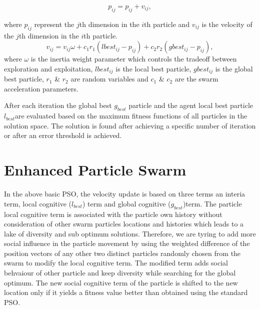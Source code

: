 \documentclass[10pt]{article}
\begin{document}
\begin{equation}
p_{ij}=p_{ij}+v_{ij},
\label{eq:Swarm1}
\end{equation}
 
where $p_{ij}$ represent the $j$th dimension in the $i$th particle and $v_{ij}$ is the velocity of the $j$th dimension in the $i$th particle.
 \begin{equation}
v_{ij}  = v_{ij} \omega + c_1 r_1 (lbest_{ij}  - p_{ij} ) + c_2 r_2 (gbest_{ij}  - p_{ij} ),
\label{eq:Swarm}
\end{equation}
 where $\omega$ is the inertia weight parameter which controls the tradeoff between exploration and exploitation,  $lbest_{ij}$ is the local best particle, $gbest_{ij}$ is the global best particle, $r_1$ \& $r_2$ are random variables and $c_1$ \& $c_2$ are the swarm acceleration parameters.  
 
 After each iteration the global best $g_{best}$ particle and the agent local best particle $l_{best}$are evaluated based on the maximum fitness functions of all particles in the solution space. The solution is found after achieving a specific number of iteration or after an error threshold is achieved.

\section{Enhanced Particle Swarm}
\label{sec:EnhancedSwarmAlgorithm}
In the above basic PSO, the velocity update is based on three terms an interia term, local cognitive ($l_{best}$) term and global cognitive ($g_{best}$)term. The particle local cognitive term is associated with the particle own history without consideration of other swarm particles locations and histories which leads to a lake of diversity and sub optimum solutions. Therefore, we are tyring to add more social influence in the particle movement by using the weighted difference of the position vectors of any other two distinct particles randomly chosen from the swarm to modify the local cognitive term. The modified term adds social behvaiour of other particle and keep diversity while searching for the global optimum. The new social cognitive term of the particle is shifted to the new location only if it yields a fitness value better than obtained using the standard PSO\cite{stockPaper}.
\end{document}

